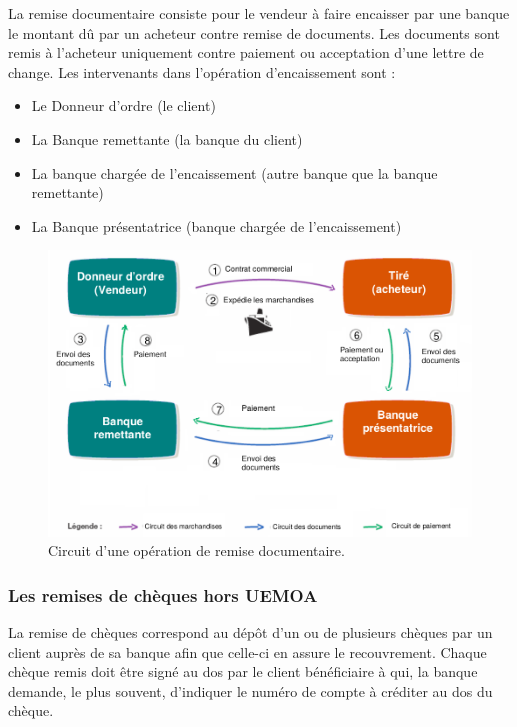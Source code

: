   La remise documentaire consiste pour le vendeur à faire encaisser par une 
  banque le montant dû par un acheteur contre remise de documents. Les
  documents sont remis à l'acheteur uniquement contre paiement ou acceptation
  d'une lettre de change.
  Les intervenants dans l'opération d'encaissement sont :
  \begin{itemize}
    \item Le Donneur d'ordre (le client)
    \item La Banque remettante (la banque du client)
    \item La banque chargée de l'encaissement (autre banque que la banque remettante)
    \item La Banque présentatrice (banque chargée de l'encaissement)
  \end{itemize}
  \begin{figure}[h!]
    \begin{center}
      \includegraphics[width=12cm]{images/remise_doc.png}
         \caption{Circuit d'une opération de remise documentaire.
         \label{fig:remise}}
    \end{center}
   \end{figure}
   
   
 \subsubsection{Les remises de chèques hors UEMOA}
 
  La remise de chèques correspond au dépôt d'un ou de plusieurs chèques par un 
  client auprès de sa banque afin que celle-ci en assure le recouvrement. Chaque
  chèque remis doit être signé au dos par le client bénéficiaire à qui, la 
  banque demande, le plus souvent, d'indiquer le numéro de compte à créditer au 
  dos du chèque.


